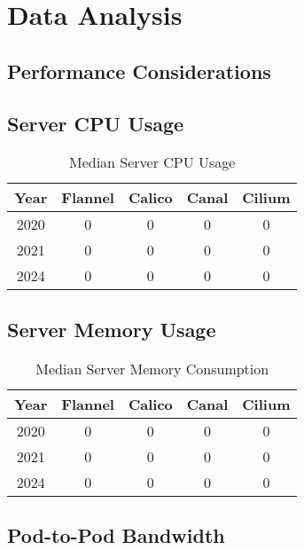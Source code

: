 %
%

\pagebreak
\section{Data Analysis}

\onehalfspacing

\subsection{Performance Considerations}

\subsection{Server CPU Usage}

\begin{table}[h!]
\caption{Median Server CPU Usage}
\begin{tabular}{|c | c | c | c | c|} 
 \hline
 Year & Flannel & Calico & Canal & Cilium \\
 \hline\hline
 2020 & 0 & 0 & 0 & 0 \\ 
 \hline
 2021 & 0 & 0 & 0 & 0 \\
 \hline
 2024 & 0 & 0 & 0 & 0 \\
 \hline
\end{tabular}
\label{tab:cpu}
\end{table}

\subsection{Server Memory Usage}

\begin{table}[h!]
\caption{Median Server Memory Consumption}
\begin{tabular}{|c | c | c | c | c|} 
 \hline
 Year & Flannel & Calico & Canal & Cilium \\
 \hline\hline
 2020 & 0 & 0 & 0 & 0 \\ 
 \hline
 2021 & 0 & 0 & 0 & 0 \\
 \hline
 2024 & 0 & 0 & 0 & 0 \\
 \hline
\end{tabular}
\label{tab:mem}
\end{table}

\subsection{Pod-to-Pod Bandwidth}

